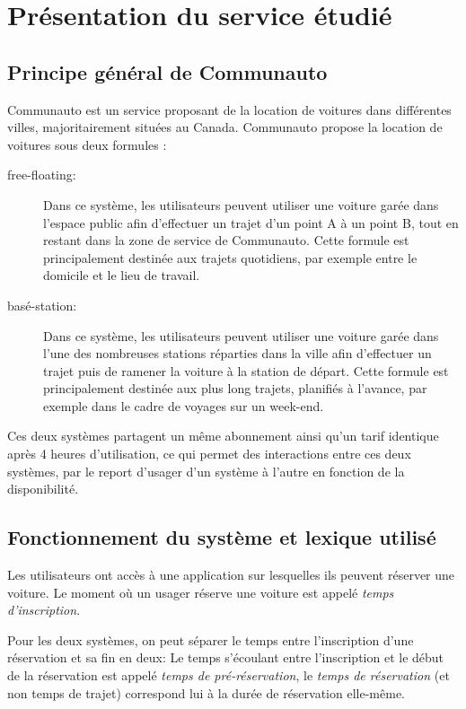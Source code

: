 \documentclass[12pt,a4paper]{article}
\author{Florian VERDIER}
\newcommand{\1}[1]{\mathbbm{1}_{\{#1\}} }
\theoremstyle{definition}
\begin{document}
\section{Présentation du service étudié}
\subsection{Principe général de Communauto}
Communauto est un service proposant de la location de voitures dans différentes villes, majoritairement situées au Canada. Communauto propose la location de voitures sous deux formules :
\begin{description}
\item[free-floating:] Dans ce système, les utilisateurs peuvent utiliser une voiture garée dans l'espace public afin d'effectuer un trajet d'un point A à un point B, tout en restant dans la zone de service de Communauto. Cette formule est principalement destinée aux trajets quotidiens, par exemple entre le domicile et le lieu de travail.
\item[basé-station:] Dans ce système, les utilisateurs peuvent utiliser une voiture garée dans l'une des nombreuses stations réparties dans la ville afin d'effectuer un trajet puis de ramener la voiture à la station de départ. Cette formule est principalement destinée aux plus long trajets, planifiés à l'avance, par exemple dans le cadre de voyages sur un week-end. 
\end{description}

Ces deux systèmes partagent un même abonnement ainsi qu'un tarif identique après 4 heures d'utilisation, ce qui permet des interactions entre ces deux systèmes, par le report d'usager d'un système à l'autre en fonction de la disponibilité.

\subsection{Fonctionnement du système et lexique utilisé}

Les utilisateurs ont accès à une application sur lesquelles ils peuvent réserver une voiture. Le moment où un usager réserve une voiture est appelé \emph{temps d'inscription}.

Pour les deux systèmes, on peut séparer le temps entre l'inscription d'une réservation et sa fin en deux: Le temps s'écoulant entre l'inscription et le début de la réservation est appelé \emph{temps de pré-réservation}, le \emph{temps de réservation} (et non temps de trajet) correspond lui à la durée de réservation elle-même.
\end{document}
